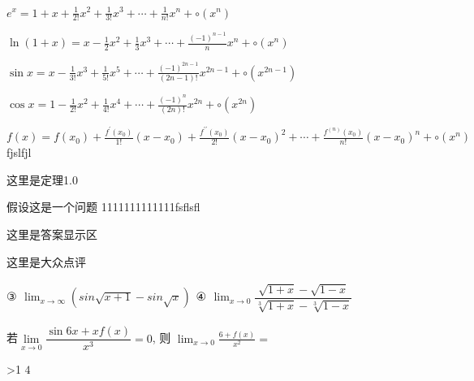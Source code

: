 \begin{thrmEqs}[泰勒]
	\item $e^x=1+x+\frac{1}{2!}x^2+\frac{1}{3!}x^3+\cdots+\frac{1}{n!}x^n+\circ(x^n)$
	\item $\ln(1+x)=x-\frac{1}{2}x^2+\frac{1}{3}x^3+\cdots+\frac{(-1)^{n-1}}{n}x^n+\circ(x^n)$
	\item $\sin{x}=x-\frac{1}{3!}x^3+\frac{1}{5!}x^5+\cdots+\frac{(-1)^{2n-1}}{(2n-1)!}x^{2n-1}+\circ(x^{2n-1})$
	\item $\cos{x}=1-\frac{1}{2!}x^2+\frac{1}{4!}x^4+\cdots+\frac{(-1)^{n}}{(2n)!}x^{2n}+\circ(x^{2n})$
	\item $f(x)=f(x_0)+\frac{f^\prime(x_0)}{1!}(x-x_0)+\frac{f^{\prime\prime}(x_0)}{2!}(x-x_0)^2+\cdots+\frac{f^{(n)}(x_0)}{n!}(x-x_0)^n+\circ(x^n)$fjslfjl
\end{thrmEqs}




	\begin{Theorems}
	这里是定理1.0
	\end{Theorems}
	假设这是一个问题	1111111111111fsflsfl
\begin{PROBLEMANSWERS}
	\begin{Analysis}
		这里是答案显示区
	\end{Analysis}
	\begin{Assess}
		这里是大众点评
	\end{Assess}
\end{PROBLEMANSWERS}

\begin{examples}
	$③\begin{matrix}\lim_{x\to\infty} (sin{\sqrt{x+1}}-sin{\sqrt{x}})\end{matrix}④\begin{matrix}\lim_{x\to{0}} \dfrac{\sqrt{1+x}-\sqrt{1-x}}{\sqrt[3]{1+x}-\sqrt[3]{1-x}}\end{matrix}$

\end{examples}


\begin{homeworks}
	\item {}若$\lim\limits_{x\to0}{\dfrac{\sin{6x}+xf(x)}{x^3}}=0$, 则 $\lim_{x\to0}{\frac{6+f(x)}{x^2}}=$
\end{homeworks}



\ifnum \value{page}>1
	$4$
\fi
